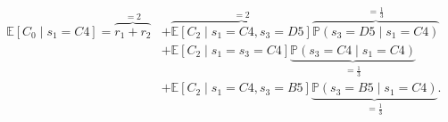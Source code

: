 \vspace{-8mm}
\begin{align}
    \begin{split}
    \mathbb{E}\left[ C_0 \mid s_1 = C4 \right] = \overbrace{r_1 + r_2}^{=2} 
    &+ \overbrace{\mathbb{E}[C_2 \mid s_1 = C4, s_3 = D5]}^{=2} \overbrace{\mathbb{P}(s_3 = D5 \mid s_1 = C4)}^{=\frac{1}{3}} \\
    &+ \mathbb{E}[C_2 \mid s_1 = s_3 = C4] \underbrace{\mathbb{P}(s_3 = C4 \mid s_1 = C4)}_{=\frac{1}{3}} \\
    &+ \mathbb{E}[C_2 \mid s_1 = C4, s_3 = B5] \underbrace{\mathbb{P}(s_3 = B5 \mid s_1 = C4)}_{=\frac{1}{3}}.
    \end{split}
    \label{eq:tower2}
\end{align}
%

